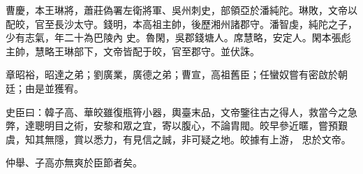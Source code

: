 \begin{pinyinscope}
 曹慶，本王琳將，蕭莊偽署左衛將軍、吳州刺史，部領亞於潘純陀。琳敗，文帝以配皎，官至長沙太守。錢明，本高祖主帥，後歷湘州諸郡守。潘智虔，純陀之子，少有志氣，年二十為巴陵內
 史。魯閑，吳郡錢塘人。席慧略，安定人。閑本張彪主帥，慧略王琳部下，文帝皆配于皎，官至郡守。並伏誅。



 章昭裕，昭達之弟；劉廣業，廣德之弟；曹宣，高祖舊臣；任蠻奴嘗有密啟於朝廷；由是並獲宥。



 史臣曰：韓子高、華皎雖復瓶筲小器，輿臺末品，文帝鑒往古之得人，救當今之急弊，達聰明目之術，安黎和眾之宜，寄以腹心，不論胄閥。皎早參近暱，嘗預艱虞，知其無隱，賞以悉力，有見信之誠，非可疑之地。皎據有上游，
 忠於文帝。



 仲舉、子高亦無爽於臣節者矣。



\end{pinyinscope}